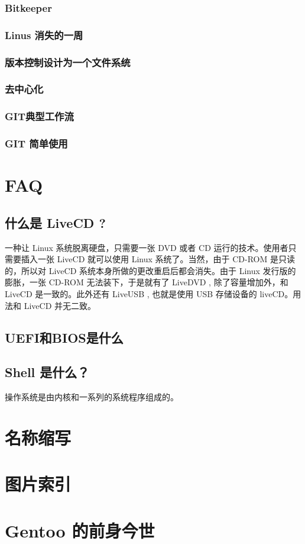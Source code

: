 \documentclass[amstex]{ctexbook}
\begin{document}
\subsection{  Bitkeeper	}
\subsection{  Linus 消失的一周	}
\subsection{  版本控制设计为一个文件系统	}
\subsection{ 去中心化	}
\subsection{  GIT典型工作流	}
\subsection{  GIT 简单使用	}


\appendix
\renewcommand{\thesection}{\arabic{section}}

\chapter{FAQ}



\section{什么是 LiveCD ?}
一种让 Linux 系统脱离硬盘，只需要一张 DVD 或者 CD 运行的技术。使用者只需要插入一张 LiveCD 就可以使用 Linux  系统了。当然，由于 CD-ROM 是只读的，所以对 LiveCD 系统本身所做的更改重启后都会消失。由于 Linux 发行版的膨胀，一张 CD-ROM 无法装下，于是就有了 LiveDVD , 除了容量增加外，和LiveCD 是一致的。此外还有 LiveUSB , 也就是使用 USB 存储设备的 liveCD。用法和 LiveCD 并无二致。

\section{UEFI和BIOS是什么}

\section{Shell 是什么？}
操作系统是由内核和一系列的系统程序组成的。

\chapter{ 名称缩写	}
\chapter{ 图片索引	}
\chapter{ Gentoo 的前身今世}
\end{document}

